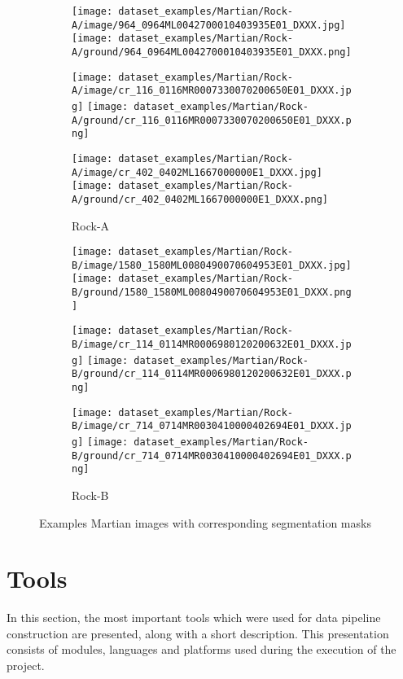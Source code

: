 \documentclass[a4paper,twoside,12pt]{book}
\begin{document}
\begin{figure}[!h]
    \centering
    \begin{subfigure}[b]{0.4\textwidth}
        \centering
        \caption{Rock-A}
        \texttt{[image: dataset\_examples/Martian/Rock-A/image/964\_0964ML0042700010403935E01\_DXXX.jpg]}
        \texttt{[image: dataset\_examples/Martian/Rock-A/ground/964\_0964ML0042700010403935E01\_DXXX.png]}

        \texttt{[image: dataset\_examples/Martian/Rock-A/image/cr\_116\_0116MR0007330070200650E01\_DXXX.jpg]}
        \texttt{[image: dataset\_examples/Martian/Rock-A/ground/cr\_116\_0116MR0007330070200650E01\_DXXX.png]}

        \texttt{[image: dataset\_examples/Martian/Rock-A/image/cr\_402\_0402ML1667000000E1\_DXXX.jpg]}
        \texttt{[image: dataset\_examples/Martian/Rock-A/ground/cr\_402\_0402ML1667000000E1\_DXXX.png]}


        \label{fig:rocka_martian_example}
    \end{subfigure}
    \begin{subfigure}[b]{0.4\textwidth}
        \centering
        \caption{Rock-B}
        \texttt{[image: dataset\_examples/Martian/Rock-B/image/1580\_1580ML0080490070604953E01\_DXXX.jpg]}
        \texttt{[image: dataset\_examples/Martian/Rock-B/ground/1580\_1580ML0080490070604953E01\_DXXX.png]}


        \texttt{[image: dataset\_examples/Martian/Rock-B/image/cr\_114\_0114MR0006980120200632E01\_DXXX.jpg]}
        \texttt{[image: dataset\_examples/Martian/Rock-B/ground/cr\_114\_0114MR0006980120200632E01\_DXXX.png]}

        \texttt{[image: dataset\_examples/Martian/Rock-B/image/cr\_714\_0714MR0030410000402694E01\_DXXX.jpg]}
        \texttt{[image: dataset\_examples/Martian/Rock-B/ground/cr\_714\_0714MR0030410000402694E01\_DXXX.png]}


        \label{fig:rockb_martian_example}
    \end{subfigure}
\caption{Examples Martian images with corresponding segmentation masks}
\label{fig:martian_dataset_examples}
\end{figure}

\section{Tools}
\label{sec:chapter2.2}
In this section, the most important tools which were used for data pipeline construction are presented, along with a short description. This presentation consists of modules, languages and platforms used during the execution of the project.
\end{document}
